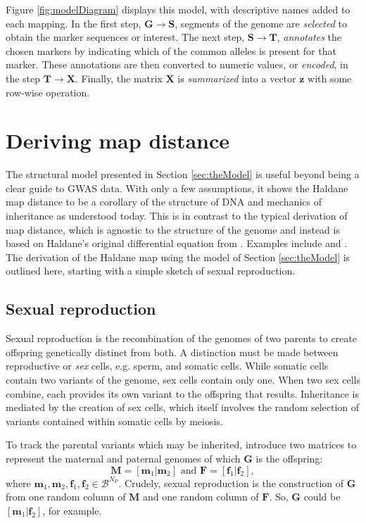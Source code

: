 \documentclass[sts]{imsart}
\newcommand{\ve}[1]{\mathbf{#1}}           %
\newcommand{\m}[1]{\mathbf{#1}}               %
\begin{document}
Figure \ref{fig:modelDiagram} displays this model, with descriptive names added to each mapping. In the first step, $\m{G} \rightarrow \m{S}$, segments of the genome are \textit{selected} to obtain the marker sequences or interest. The next step, $\m{S} \rightarrow \m{T}$, \textit{annotates} the chosen markers by indicating which of the common alleles is present for that marker. These annotations are then converted to numeric values, or \textit{encoded}, in the step $\m{T} \rightarrow \m{X}$. Finally, the matrix $\m{X}$ is \textit{summarized} into a vector $\ve{z}$ with some row-wise operation.

\section{Deriving map distance} \label{sec:derivingDists}

The structural model presented in Section \ref{sec:theModel} is useful beyond being a clear guide to GWAS data. With only a few assumptions, it shows the Haldane map distance to be a corollary of the structure of DNA and mechanics of inheritance as understood today. This is in contrast to the typical derivation of map distance, which is agnostic to the structure of the genome and instead is based on Haldane's original differential equation from \cite{haldane1919}. Examples include \cite{kosambi1943estimation} and \cite{xu2013principles}. The derivation of the Haldane map using the model of Section \ref{sec:theModel} is outlined here, starting with a simple sketch of sexual reproduction.

\subsection{Sexual reproduction} \label{subsec:crossingover}

Sexual reproduction is the recombination of the genomes of two parents to create offspring genetically distinct from both. A distinction must be made between reproductive or \emph{sex} cells, e.g. sperm, and somatic cells. While somatic cells contain two variants of the genome, sex cells contain only one. When two sex cells combine, each provides its own variant to the offspring that results. Inheritance is mediated by the creation of sex cells, which itself involves the random selection of variants contained within somatic cells by meiosis.

To track the parental variants which may be inherited, introduce two matrices to represent the maternal and paternal genomes of which $\m{G}$ is the offspring:
$$\m{M} = [\ve{m}_1| \ve{m}_2] \text{ and } \m{F} = [\ve{f}_1| \ve{f}_2],$$
where $\ve{m}_1, \ve{m}_2, \ve{f}_1, \ve{f}_2 \in \mathcal{B}^{N_P}$. Crudely, sexual reproduction is the construction of $\m{G}$ from one random column of $\m{M}$ and one random column of $\m{F}$. So, $\m{G}$ could be $[\ve{m}_1 | \ve{f}_2]$, for example.
\end{document}
